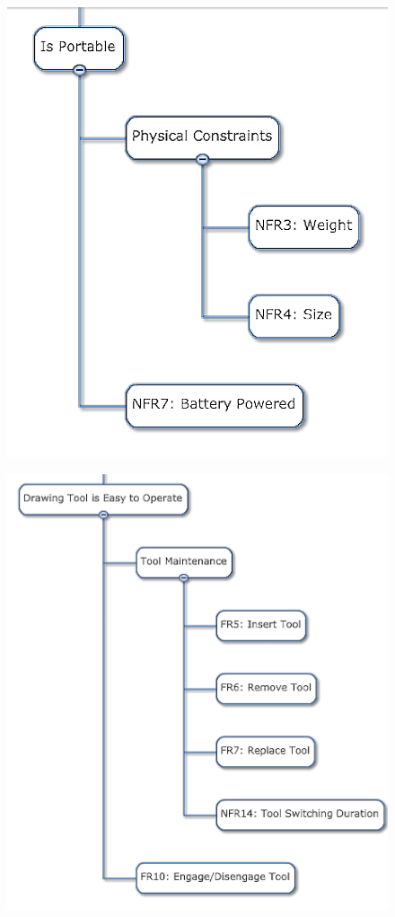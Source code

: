 \begin{figure}[h!]
\centering
\includegraphics[width=0.98\columnwidth]{figs/objectives_tree/objectives_tree_portable.png}
\label{fig:obj_tree_portable}
\end{figure}
\begin{figure}[h!]
\centering
\includegraphics[width=0.98\columnwidth]{figs/objectives_tree/objectives_tree_easy_tool_ops.png}
\label{fig:obj_tree_tool}
\end{figure}

